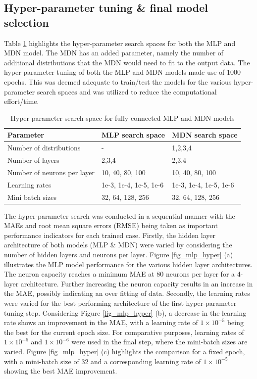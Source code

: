 \documentclass[a4paper,fleqn]{cas-sc}
\begin{document}
\subsection{Hyper-parameter tuning \& final model selection}\label{sec_hyper}
Table \ref{tbl_tuning} highlights the hyper-parameter search spaces for both the MLP and MDN model. The MDN has an added parameter, namely the number of additional distributions that the MDN would need to fit to the output data. The hyper-parameter tuning of both the MLP and MDN models made use of 1000 epochs. This was deemed adequate to train/test the models for the various hyper-parameter search spaces and was utilized to reduce the computational effort/time.
\begin{table}[pos=h]
\caption{Hyper-parameter search space for fully connected MLP and MDN models}\label{tbl_tuning}
\begin{tabular*}{\tblwidth}{p{}p{}p{}}
\toprule
 Parameter& MLP search space & MDN search space \\ %
\midrule
 Number of distributions & - & 1,2,3,4  \\
 Number of layers & 2,3,4 & 2,3,4\\
 Number of neurons per layer & 10, 40, 80, 100  & 10, 40, 80, 100\\
 Learning rates & 1e-3, 1e-4, 1e-5, 1e-6 &  1e-3, 1e-4, 1e-5, 1e-6   \\
 Mini batch sizes  &32, 64, 128, 256 &32, 64, 128, 256  \\
\bottomrule
\end{tabular*}
\end{table}

The hyper-parameter search was conducted in a sequential manner with the MAEs and root mean square errors (RMSE) being taken as important performance indicators for each trained case. Firstly, the hidden layer architecture of both models (MLP \& MDN) were varied by considering the number of hidden layers and neurons per layer. Figure \ref{fig_mlp_hyper} (a) illustrates the MLP model performance for the various hidden layer architectures. The neuron capacity reaches a minimum MAE at 80 neurons per layer for a 4-layer architecture. Further increasing the neuron capacity results in an increase in the MAE, possibly indicating an over fitting of data. Secondly, the learning rates were varied for the best performing architecture of the first hyper-parameter tuning step. Considering Figure \ref{fig_mlp_hyper} (b), a decrease in the learning rate shows an improvement in the MAE, with a learning rate of $1\times10^{-5}$ being the best for the current epoch size. For comparative purposes, learning rates of $1\times10^{-5}$ and $1\times10^{-6}$ were used in the final step, where the mini-batch sizes are varied. Figure \ref{fig_mlp_hyper} (c) highlights the comparison for a fixed epoch, with a mini-batch size of 32 and a corresponding learning rate of $1\times10^{-5}$ showing the best MAE improvement.\\
\end{document}
